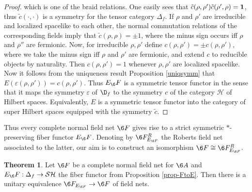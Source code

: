 \documentclass[11pt]{article}
\theoremstyle{definition}
\newtheorem{thm}{Theorem}[section]
\theoremstyle{definition}
\theoremstyle{remark}
\newcommand{\ve}{\varepsilon}
\def\2#1{{\mathcal #1}}
\def\1#1{{\bf #1}}
\newcommand{\rarr}{\rightarrow}
\begin{document}
\begin{proof}
which is one of the braid relations. One easily sees that
$\tilde{c}(\rho,\rho')\tilde{c}(\rho',\rho)=\11$, thus $\tilde{c}(\cdot,\cdot)$ is a symmetry for
the tensor category $\Delta_f$. If $\rho$ and $\rho'$ are irreducible and localized spacelike to
each other, the normal commutation relations of the corresponding fields imply that
$\tilde{c}(\rho,\rho)=\pm 1$, where the minus sign occurs iff $\rho$ and $\rho''$ are
fermionic. Now, for irreducible $\rho,\rho'$ define $c(\rho,\rho')=\pm c(\rho,\rho')$, where we take
the minus sign iff $\rho$ and $\rho'$ are fermionic, and extend $c$ to reducible objects by
naturality. Then $c(\rho,\rho')=1$ whenever $\rho,\rho'$ are localized spacelike. Now it follows
from the uniqueness result Proposition \ref{uniqsymm} that $E(\ve(\rho,\rho'))=c(\rho,\rho')$. 
Thus $E_\6F$ is a symmetric tensor functor in the sense that it maps the symmetry $\ve$ of $\D_f$ to
the symmetry $c$ of the category $\2H$ of Hilbert spaces. Equivalently, $E$ is a symmetric tensor
functor into the category of super Hilbert spaces equipped with the symmetry $\widetilde{c}$.
\end{proof}

Thus every complete normal field net $\6F$ gives rise to a strict symmetric $*$-preserving fiber
functor $E_\6F$. Denoting by $\6F^R_{E_{\6F}}$ the Roberts field net associated to the latter, our
aim is to construct an isomorphism $\6F\cong\6F^R_{E_{\6F}}$. 

\begin{thm} Let $\6F$ be a complete normal field net for $\6A$ and $E_\6F:\Delta_f\rarr\2S\2H$ the fiber
functor from Proposition \ref{prop-FtoE}. Then there is a unitary equivalence
$\6F_{E_{\6F}}\rarr\6F$ of field nets.
\end{thm}
\end{document}
